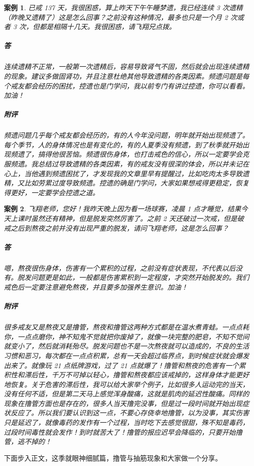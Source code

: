 \documentclass{ctexart}
\newtheorem{case}{案例}
\begin{document}
\begin{case}
    已戒 137 天，我很困惑，算上昨天下午午睡梦遗，我已经连续 3 次遗精（昨晚又遗精了）这是怎么回事？之前没有这种情况，最多也只是一个月 2 次或者 3 次，但都是相隔十几天。我很困惑，请飞翔兄点拨。
    \subparagraph{答} 连续遗精不正常，一般第一次遗精后，容易导致肾气不固，然后就会出现连续遗精的现象。建议多做固肾功，并且注意杜绝其他导致遗精的各类因素。频遗问题是每个戒友都会经历的困扰，控遗也是门学问，我以前专门有讲过控遗，你可以看看。加油！
    \subparagraph{附评} 频遗问题几乎每个戒友都会经历的，有的人今年没问题，明年就开始出现频遗了。每个季节，人的身体情况也是有变化的，有的人夏季没有频遗，到了秋季就开始出现频遗了，搞得他很苦恼。频遗很伤身体，也打击戒色的信心，所以一定要学会克服频遗。我总结过导致遗精的各类因素，有的戒友没有很深的体会，所以并未记在心上，当他遇到频遗困扰了，才发现我的文章里早有提醒过，比如吃肉太多导致遗精，又比如劳累过度导致频遗。控遗的确是门学问，大家如果想戒得更稳定，恢复得更好，一定要学会控遗之道。
\end{case}

\begin{case}
    飞翔老师，您好！我昨天晚上因为看一场球赛，凌晨 1 点才睡觉，结果今天上课时虽然还有精神，但是脱发突然厉害了。之前 2 天还破过一次戒，但是破戒之后到熬夜之前并没有出现严重的脱发，请问飞翔老师，这是怎么回事？
    \subparagraph{答} 嗯，熬夜很伤身体，伤害有一个累积的过程，之前没有症状表现，不代表以后没有。脱发问题更是如此，一般都是伤害累积到一定程度，才突然开始脱发的。我们戒色后一定要注意避免熬夜，并且要多加强养生意识。加油！
    \subparagraph{附评} 很多戒友又是熬夜又是撸管，熬夜和撸管这两种方式都是在温水煮青蛙。一点点耗你，一点点磨你，神不知鬼不觉就把你废掉了，就像一块完整的肥皂，不知不觉间就变小了，然后就消耗殆尽。脱发问题也不是一次熬夜就可以造成的，不良的生活习惯和恶习，每次都在一点点积累，总有一天会超过临界点，到时候症状就会爆发出来了。就像玩 21 点纸牌游戏，过了 21 点就爆了！撸管和熬夜的危害有一个累积性和滞后性，千万不可掉以轻心，撸管和熬夜都应该戒掉的，这样身体才能更好地恢复。关于危害的滞后性，我可以给大家举个例子，比如很多人运动完的当天，没有任何不适，但是第二天马上感觉浑身酸痛，这就是肌肉的延迟性酸痛。同样的现象在撸管方面也是存在的，很多人当天撸完没事，但是过一段时间就开始出现症状反应了。所以我们要认识到这一点，不要心存侥幸地撸管，以为没事，其实伤害只是延迟了，就像毒药的发作有一个过程，当时吃下去感觉很甜，殊不知是毒药，过段时间毒性就会发作！到时就苦大了！撸管的报应迟早会降临的，只要开始撸管，逃不掉的！
\end{case}

下面步入正文，这季就眼神细腻篇，撸管与抽筋现象和大家做一个分享。
\end{document}
